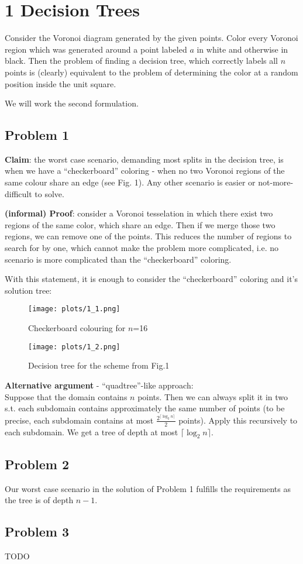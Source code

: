 \section*{1 Decision Trees}

Consider the Voronoi diagram generated by the given points. Color every Voronoi region which was generated around a point labeled $a$ in white and otherwise in black. Then the problem of finding a decision tree, which correctly labels all $n$ points is (clearly) equivalent to the problem of determining the color at a random position inside the unit square.

We will work the second formulation.

\subsection*{Problem 1}

\textbf{Claim}: the worst case scenario, demanding most splits in the decision tree, is when we have a ``checkerboard'' coloring - when no two Voronoi regions of the same colour share an edge (see Fig. 1). Any other scenario is easier or not-more-difficult to solve.

\textbf{(informal) Proof}: consider a Voronoi tesselation in which there exist two regions of the same color, which share an edge. Then if we merge those two regions, we can remove one of the points. This reduces the number of regions to search for by one, which cannot make the problem more complicated, i.e. no scenario is more complicated than the ``checkerboard'' coloring.

With this statement, it is enough to consider the ``checkerboard'' coloring and it's solution tree:

\begin{figure}[!h]
  \begin{center}
    \texttt{[image: plots/1\_1.png]}
    \caption{Checkerboard colouring for $n$=16}
  \end{center}
\end{figure}


\begin{figure}[!ht]
  \begin{center}
    \texttt{[image: plots/1\_2.png]}
    \caption{Decision tree for the scheme from Fig.1}
  \end{center}
\end{figure}


\textbf{Alternative argument} - ``quadtree''-like approach:\\
Suppose that the domain contains $n$ points. Then we can always split it in two s.t. each subdomain contains approximately the same number of points (to be precise, each subdomain contains at most $\frac{2^{\lceil\log_2n\rceil}}{2}$ points). Apply this recursively to each subdomain. We get a tree of depth at most $\lceil\log_2n\rceil$.

\subsection*{Problem 2}
Our worst case scenario in the solution of Problem 1 fulfills the requirements as the tree is of depth $n-1$.

\subsection*{Problem 3}
TODO
